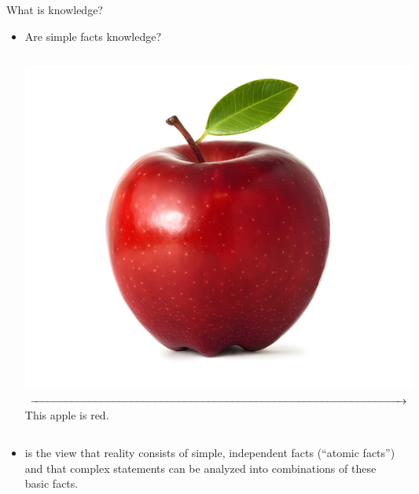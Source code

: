 \begin{frame}{What is knowledge?}
    \begin{itemize}
        \item
              Are simple facts knowledge?
              \vspace{1em}
              \begin{center}
                  \begin{minipage}{0.7\textwidth}
                      \begin{columns}[c]
                          \centering
                          \includegraphics[width=\linewidth]{images/red-apple.png}
                          \centering
                          $\xrightarrow{\rule{\linewidth}{0pt}}$
                          This apple is red.
                      \end{columns}
                  \end{minipage}
              \end{center}
        \item {} is the view that reality consists of simple, independent facts (“atomic facts”) and that complex statements can be analyzed into combinations of these basic facts.
    \end{itemize}
\end{frame}

